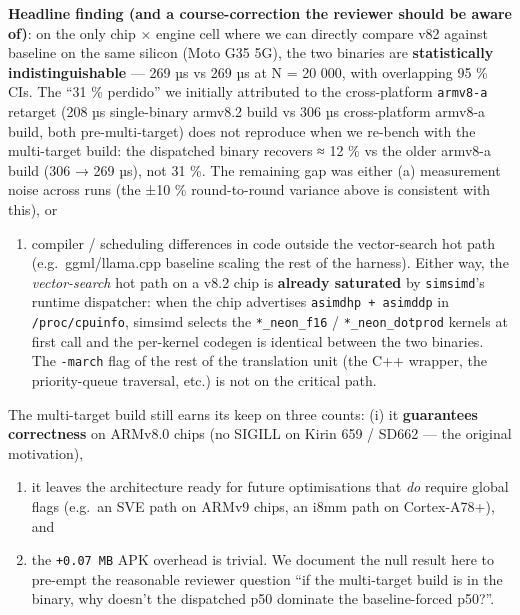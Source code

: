 \begin{enumerate}
  \textbf{Headline finding (and a course-correction the reviewer should be aware
  of)}: on the only chip × engine cell where we can directly compare v82 against
  baseline on the same silicon (Moto G35 5G), the two binaries are
  \textbf{statistically indistinguishable} --- 269 µs vs 269 µs at N = 20 000,
  with overlapping 95 \% CIs. The ``31 \% perdido'' we initially attributed to
  the cross-platform \texttt{armv8-a} retarget (208 µs single-binary armv8.2
  build vs 306 µs cross-platform armv8-a build, both pre-multi-target) does not
  reproduce when we re-bench with the multi-target build: the dispatched binary
  recovers ≈ 12 \% vs the older armv8-a build (306 → 269 µs), not 31 \%. The
  remaining gap was either (a) measurement noise across runs (the ±10 \%
  round-to-round variance above is consistent with this), or

  \begin{enumerate}
  \def\labelenumii{(\alph{enumii})}
  \setcounter{enumii}{1}
  \tightlist
  \item
    compiler / scheduling differences in code outside the vector-search hot path
    (e.g.~ggml/llama.cpp baseline scaling the rest of the harness). Either way,
    the \emph{vector-search} hot path on a v8.2 chip is \textbf{already
    saturated} by \texttt{simsimd}'s runtime dispatcher: when the chip
    advertises \texttt{asimdhp\ +\ asimddp} in \texttt{/proc/cpuinfo}, simsimd
    selects the \texttt{*\_neon\_f16} / \texttt{*\_neon\_dotprod} kernels at
    first call and the per-kernel codegen is identical between the two binaries.
    The \texttt{-march} flag of the rest of the translation unit (the C++
    wrapper, the priority-queue traversal, etc.) is not on the critical path.
  \end{enumerate}

  The multi-target build still earns its keep on three counts: (i) it
  \textbf{guarantees correctness} on ARMv8.0 chips (no SIGILL on Kirin 659 /
  SD662 --- the original motivation),

  \begin{enumerate}
  \def\labelenumii{(\roman{enumii})}
  \setcounter{enumii}{1}
  \tightlist
  \item
    it leaves the architecture ready for future optimisations that \emph{do}
    require global flags (e.g.~an SVE path on ARMv9 chips, an i8mm path on
    Cortex-A78+), and
  \item
    the \texttt{+0.07\ MB} APK overhead is trivial. We document the null result
    here to pre-empt the reasonable reviewer question ``if the multi-target
    build is in the binary, why doesn't the dispatched p50 dominate the
    baseline-forced p50?''.
  \end{enumerate}


\end{enumerate}
